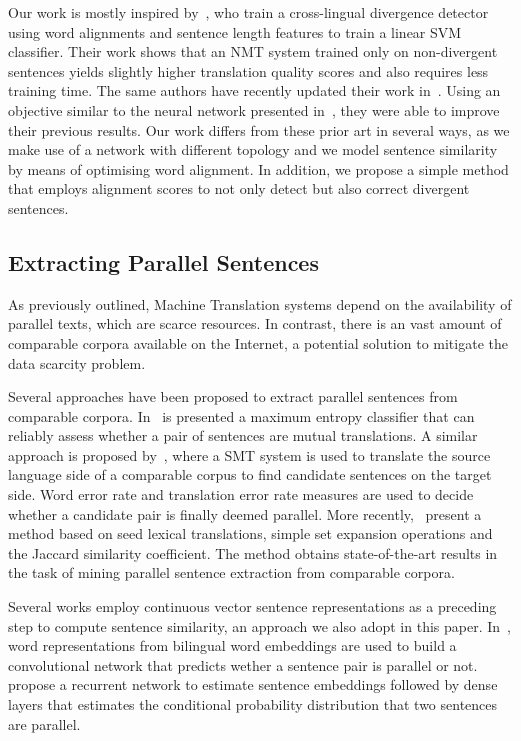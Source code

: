 \documentclass[11pt,a4paper]{article}
\begin{document}
Our work is mostly inspired by~\citet{W17-3209}, who train a
cross-lingual divergence detector using word alignments and sentence
length features to train a linear SVM classifier. Their work shows
that an NMT system trained only on non-divergent sentences yields
slightly higher translation quality scores and also requires less
training time. The same authors have recently updated their work
in~\cite{DBLP:journals/corr/abs-1803-11112}. Using an objective
similar to the neural network presented in~\cite{N16-1108}, they were
able to improve their previous results. Our work differs from these
prior art in several ways, as we make use of a network with different
topology and we model sentence similarity by means of optimising word
alignment. In addition, we propose a simple method that employs
alignment scores to not only detect but also correct divergent sentences.

\subsection{Extracting Parallel Sentences}

As previously outlined, Machine Translation systems depend on the
availability of parallel texts, which are scarce resources. In contrast, there is an vast amount of comparable corpora available on the Internet, a potential solution to mitigate the data scarcity problem.

Several approaches have been proposed to extract parallel sentences from comparable corpora. 
In~\cite{J05-4003} is presented a maximum entropy classifier that can
reliably assess whether a pair of sentences are mutual translations. 
A similar approach is proposed by~\cite{E09-1003}, where a SMT system
is used to translate the source language side of a comparable corpus
to find candidate sentences on the target side. Word error rate and
translation error rate measures are used to decide whether a candidate
pair is finally deemed parallel. 
More recently,~\cite{W17-2508} present a method based on seed lexical
translations, simple set expansion operations and the Jaccard
similarity coefficient. The method obtains state-of-the-art results in
the task of mining parallel sentence extraction from comparable corpora.

Several works employ continuous vector sentence representations as a
preceding step to compute sentence similarity, an approach we also
adopt in this paper. In~\cite{W15-1521}, word representations from
bilingual word embeddings are used to build a convolutional network
that predicts wether a sentence pair is parallel or not. \citet{W17-2509} propose a recurrent network to estimate sentence embeddings followed by dense layers that estimates the conditional probability distribution that two sentences are parallel.
\end{document}
